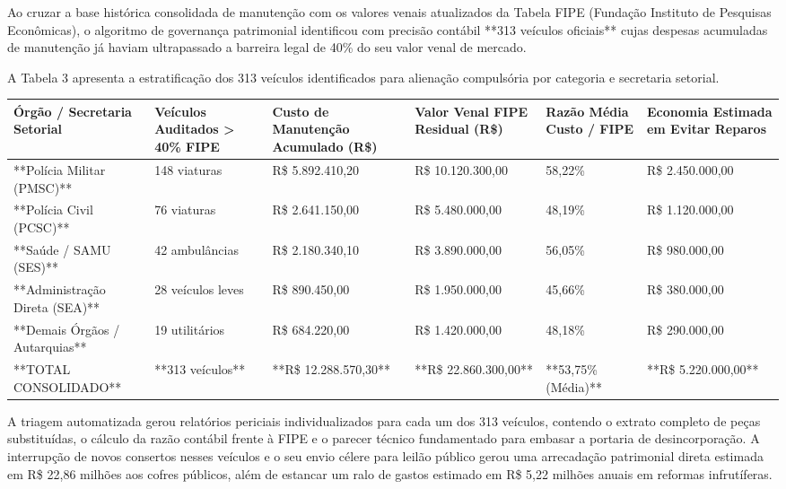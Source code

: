 \documentclass[10pt,a4paper,journal]{article}
\begin{document}
Ao cruzar a base histórica consolidada de manutenção com os valores venais atualizados da Tabela FIPE (Fundação Instituto de Pesquisas Econômicas), o algoritmo de governança patrimonial identificou com precisão contábil **313 veículos oficiais** cujas despesas acumuladas de manutenção já haviam ultrapassado a barreira legal de 40\% do seu valor venal de mercado.

A Tabela 3 apresenta a estratificação dos 313 veículos identificados para alienação compulsória por categoria e secretaria setorial.

\begin{table}[htbp]
\centering
\small
\begin{tabular}{llllll}
\toprule
Órgão / Secretaria Setorial & Veículos Auditados > 40\% FIPE & Custo de Manutenção Acumulado (R\$) & Valor Venal FIPE Residual (R\$) & Razão Média Custo / FIPE & Economia Estimada em Evitar Reparos \\
\midrule
**Polícia Militar (PMSC)** & 148 viaturas & R\$ 5.892.410,20 & R\$ 10.120.300,00 & 58,22\% & R\$ 2.450.000,00 \\
**Polícia Civil (PCSC)** & 76 viaturas & R\$ 2.641.150,00 & R\$ 5.480.000,00 & 48,19\% & R\$ 1.120.000,00 \\
**Saúde / SAMU (SES)** & 42 ambulâncias & R\$ 2.180.340,10 & R\$ 3.890.000,00 & 56,05\% & R\$ 980.000,00 \\
**Administração Direta (SEA)** & 28 veículos leves & R\$ 890.450,00 & R\$ 1.950.000,00 & 45,66\% & R\$ 380.000,00 \\
**Demais Órgãos / Autarquias** & 19 utilitários & R\$ 684.220,00 & R\$ 1.420.000,00 & 48,18\% & R\$ 290.000,00 \\
**TOTAL CONSOLIDADO** & **313 veículos** & **R\$ 12.288.570,30** & **R\$ 22.860.300,00** & **53,75\% (Média)** & **R\$ 5.220.000,00** \\
\bottomrule
\end{tabular}
\end{table}
A triagem automatizada gerou relatórios periciais individualizados para cada um dos 313 veículos, contendo o extrato completo de peças substituídas, o cálculo da razão contábil frente à FIPE e o parecer técnico fundamentado para embasar a portaria de desincorporação. A interrupção de novos consertos nesses veículos e o seu envio célere para leilão público gerou uma arrecadação patrimonial direta estimada em R\$ 22,86 milhões aos cofres públicos, além de estancar um ralo de gastos estimado em R\$ 5,22 milhões anuais em reformas infrutíferas.
\end{document}
